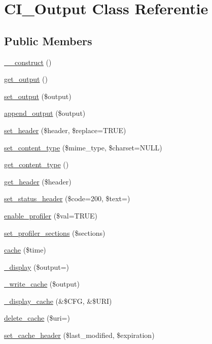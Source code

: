 \hypertarget{class_c_i___output}{}\section{C\+I\+\_\+\+Output Class Referentie}
\label{class_c_i___output}
\subsection*{Public Members}
\begin{DoxyCompactItemize}
\item 
\mbox{\hyperlink{class_c_i___output_a095c5d389db211932136b53f25f39685}{\+\_\+\+\_\+construct}} ()
\item 
\mbox{\hyperlink{class_c_i___output_aa6c3f8688f804de4f1af8a462fffb922}{get\+\_\+output}} ()
\item 
\mbox{\hyperlink{class_c_i___output_afcff30d791a8006216f5c2fe93a95983}{set\+\_\+output}} (\$output)
\item 
\mbox{\hyperlink{class_c_i___output_a7c79b8239d6ecbba0c8fdd00bb619651}{append\+\_\+output}} (\$output)
\item 
\mbox{\hyperlink{class_c_i___output_a270389a1636faa81eda5ef3fa900ea25}{set\+\_\+header}} (\$header, \$replace=T\+R\+UE)
\item 
\mbox{\hyperlink{class_c_i___output_a7e04aad8dafeec2b8626285e81231f0c}{set\+\_\+content\+\_\+type}} (\$mime\+\_\+type, \$charset=N\+U\+LL)
\item 
\mbox{\hyperlink{class_c_i___output_a4d8c59d65c47c9146dbc1c7d0c4eccf2}{get\+\_\+content\+\_\+type}} ()
\item 
\mbox{\hyperlink{class_c_i___output_afc84ca7f4f93817160ea738f2f899a74}{get\+\_\+header}} (\$header)
\item 
\mbox{\hyperlink{class_c_i___output_a6fa308cb1fadec4938edade0a51eb773}{set\+\_\+status\+\_\+header}} (\$code=200, \$text=\textquotesingle{}\textquotesingle{})
\item 
\mbox{\hyperlink{class_c_i___output_a7bd693db25952e1b074630f52ee67500}{enable\+\_\+profiler}} (\$val=T\+R\+UE)
\item 
\mbox{\hyperlink{class_c_i___output_ac5e50de443748cf3d356d29eba2caaaf}{set\+\_\+profiler\+\_\+sections}} (\$sections)
\item 
\mbox{\hyperlink{class_c_i___output_a6eae3cd828cf30926d44f1ab6011f939}{cache}} (\$time)
\item 
\mbox{\hyperlink{class_c_i___output_acc6949872b39347a6314db4bc8c45c50}{\+\_\+display}} (\$output=\textquotesingle{}\textquotesingle{})
\item 
\mbox{\hyperlink{class_c_i___output_a772aa9eb3f60f66fa194443ca0bdd8a4}{\+\_\+write\+\_\+cache}} (\$output)
\item 
\mbox{\hyperlink{class_c_i___output_acce78bdac02df9ab196a9c5939f6c4ab}{\+\_\+display\+\_\+cache}} (\&\$C\+FG, \&\$U\+RI)
\item 
\mbox{\hyperlink{class_c_i___output_a475c83a7e4d2f7162032c01279c161b4}{delete\+\_\+cache}} (\$uri=\textquotesingle{}\textquotesingle{})
\item 
\mbox{\hyperlink{class_c_i___output_acd24befdfc26233abfbdc62071dcd58b}{set\+\_\+cache\+\_\+header}} (\$last\+\_\+modified, \$expiration)
\end{DoxyCompactItemize}
